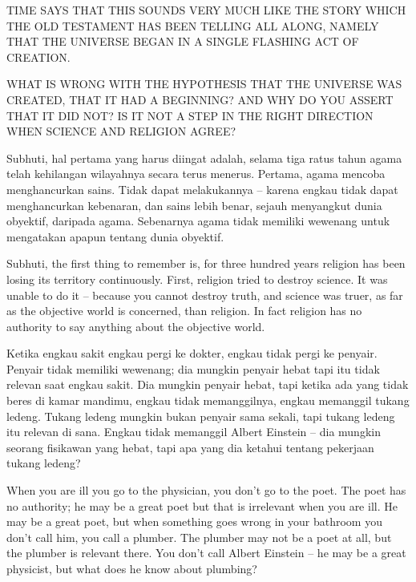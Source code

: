 TIME SAYS THAT THIS SOUNDS VERY MUCH LIKE THE STORY WHICH THE OLD TESTAMENT HAS BEEN TELLING ALL ALONG, NAMELY THAT THE UNIVERSE BEGAN IN A SINGLE FLASHING ACT OF CREATION.

WHAT IS WRONG WITH THE HYPOTHESIS THAT THE UNIVERSE WAS CREATED, THAT IT HAD A BEGINNING? AND WHY DO YOU ASSERT THAT IT DID NOT? IS IT NOT A STEP IN THE RIGHT DIRECTION WHEN SCIENCE AND RELIGION AGREE?

\bahasa
Subhuti, hal pertama yang harus diingat adalah, selama tiga ratus tahun agama telah kehilangan wilayahnya secara terus menerus. Pertama, agama mencoba menghancurkan sains. Tidak dapat melakukannya -- karena engkau tidak dapat menghancurkan kebenaran, dan sains lebih benar, sejauh menyangkut dunia obyektif, daripada agama. Sebenarnya agama tidak memiliki wewenang untuk mengatakan apapun tentang dunia obyektif.

\english
Subhuti, the first thing to remember is, for three hundred years religion has been losing its territory continuously. First, religion tried to destroy science. It was unable to do it -- because you cannot destroy truth, and science was truer, as far as the objective world is concerned, than religion. In fact religion has no authority to say anything about the objective world.

\bahasa
Ketika engkau sakit engkau pergi ke dokter, engkau tidak pergi ke penyair. Penyair tidak memiliki wewenang; dia mungkin penyair hebat tapi itu tidak relevan saat engkau sakit. Dia mungkin penyair hebat, tapi ketika ada yang tidak beres di kamar mandimu, engkau tidak memanggilnya, engkau memanggil tukang ledeng. Tukang ledeng mungkin bukan penyair sama sekali, tapi tukang ledeng itu relevan di sana. Engkau tidak memanggil Albert Einstein -- dia mungkin seorang fisikawan yang hebat, tapi apa yang dia ketahui tentang pekerjaan tukang ledeng?

\english
When you are ill you go to the physician, you don't go to the poet. The poet has no authority; he may be a great poet but that is irrelevant when you are ill. He may be a great poet, but when something goes wrong in your bathroom you don't call him, you call a plumber. The plumber may not be a poet at all, but the plumber is relevant there. You don't call Albert Einstein -- he may be a great physicist, but what does he know about plumbing?
